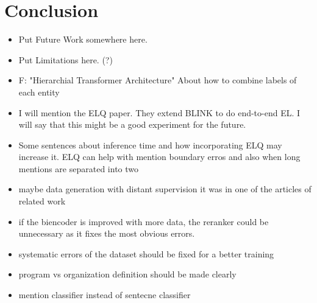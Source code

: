 \documentclass{report}
\theoremstyle{definition}
\theoremstyle{remark}
\begin{document}
\chapter{Conclusion}
\begin{itemize}
    \item Put Future Work somewhere here.
    \item Put Limitations here. (?)
    \item F: "Hierarchial Transformer Architecture" About how to combine labels of each entity 
    \item  I will mention the ELQ paper. They extend BLINK to do end-to-end EL. I will say that this might be a good experiment for the future.
    \item Some sentences about inference time and how incorporating ELQ may increase it. ELQ can help with mention boundary erros and also when long mentions are separated into two
    \item maybe data generation with distant supervision it was in one of the articles of related work
    \item if the biencoder is improved with more data, the reranker could be unnecessary as it fixes the most obvious errors.
    \item systematic errors of the dataset should be fixed for a better training
    \item program vs organization definition should be made clearly
    \item mention classifier instead of sentecne classifier
\end{itemize}








\appendix
\newpage
\end{document}
